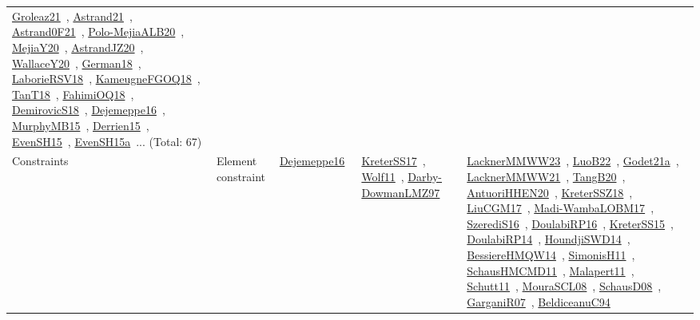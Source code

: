 {\begin{longtable}{lp{3cm}>{\raggedright\arraybackslash}p{6cm}>{\raggedright\arraybackslash}p{6cm}>{\raggedright\arraybackslash}p{8cm}}
\href{../works/Groleaz21.pdf}{Groleaz21}~\cite{Groleaz21}, \href{../works/Astrand21.pdf}{Astrand21}~\cite{Astrand21}, \href{../works/Astrand0F21.pdf}{Astrand0F21}~\cite{Astrand0F21}, \href{../works/Polo-MejiaALB20.pdf}{Polo-MejiaALB20}~\cite{Polo-MejiaALB20}, \href{../works/MejiaY20.pdf}{MejiaY20}~\cite{MejiaY20}, \href{../works/AstrandJZ20.pdf}{AstrandJZ20}~\cite{AstrandJZ20}, \href{../works/WallaceY20.pdf}{WallaceY20}~\cite{WallaceY20}, \href{../works/German18.pdf}{German18}~\cite{German18}, \href{../works/LaborieRSV18.pdf}{LaborieRSV18}~\cite{LaborieRSV18}, \href{../works/KameugneFGOQ18.pdf}{KameugneFGOQ18}~\cite{KameugneFGOQ18}, \href{../works/TanT18.pdf}{TanT18}~\cite{TanT18}, \href{../works/FahimiOQ18.pdf}{FahimiOQ18}~\cite{FahimiOQ18}, \href{../works/DemirovicS18.pdf}{DemirovicS18}~\cite{DemirovicS18}, \href{../works/Dejemeppe16.pdf}{Dejemeppe16}~\cite{Dejemeppe16}, \href{../works/MurphyMB15.pdf}{MurphyMB15}~\cite{MurphyMB15}, \href{../works/Derrien15.pdf}{Derrien15}~\cite{Derrien15}, \href{../works/EvenSH15.pdf}{EvenSH15}~\cite{EvenSH15}, \href{../works/EvenSH15a.pdf}{EvenSH15a}~\cite{EvenSH15a}... (Total: 67)\\
Constraints & Element constraint & \href{../works/Dejemeppe16.pdf}{Dejemeppe16}~\cite{Dejemeppe16} & \href{../works/KreterSS17.pdf}{KreterSS17}~\cite{KreterSS17}, \href{../works/Wolf11.pdf}{Wolf11}~\cite{Wolf11}, \href{../works/Darby-DowmanLMZ97.pdf}{Darby-DowmanLMZ97}~\cite{Darby-DowmanLMZ97} & \href{../works/LacknerMMWW23.pdf}{LacknerMMWW23}~\cite{LacknerMMWW23}, \href{../works/LuoB22.pdf}{LuoB22}~\cite{LuoB22}, \href{../works/Godet21a.pdf}{Godet21a}~\cite{Godet21a}, \href{../works/LacknerMMWW21.pdf}{LacknerMMWW21}~\cite{LacknerMMWW21}, \href{../works/TangB20.pdf}{TangB20}~\cite{TangB20}, \href{../works/AntuoriHHEN20.pdf}{AntuoriHHEN20}~\cite{AntuoriHHEN20}, \href{../works/KreterSSZ18.pdf}{KreterSSZ18}~\cite{KreterSSZ18}, \href{../works/LiuCGM17.pdf}{LiuCGM17}~\cite{LiuCGM17}, \href{../works/Madi-WambaLOBM17.pdf}{Madi-WambaLOBM17}~\cite{Madi-WambaLOBM17}, \href{../works/SzerediS16.pdf}{SzerediS16}~\cite{SzerediS16}, \href{../works/DoulabiRP16.pdf}{DoulabiRP16}~\cite{DoulabiRP16}, \href{../works/KreterSS15.pdf}{KreterSS15}~\cite{KreterSS15}, \href{../works/DoulabiRP14.pdf}{DoulabiRP14}~\cite{DoulabiRP14}, \href{../works/HoundjiSWD14.pdf}{HoundjiSWD14}~\cite{HoundjiSWD14}, \href{../works/BessiereHMQW14.pdf}{BessiereHMQW14}~\cite{BessiereHMQW14}, \href{../works/SimonisH11.pdf}{SimonisH11}~\cite{SimonisH11}, \href{../works/SchausHMCMD11.pdf}{SchausHMCMD11}~\cite{SchausHMCMD11}, \href{../works/Malapert11.pdf}{Malapert11}~\cite{Malapert11}, \href{../works/Schutt11.pdf}{Schutt11}~\cite{Schutt11}, \href{../works/MouraSCL08.pdf}{MouraSCL08}~\cite{MouraSCL08}, \href{../works/SchausD08.pdf}{SchausD08}~\cite{SchausD08}, \href{../works/GarganiR07.pdf}{GarganiR07}~\cite{GarganiR07}, \href{../works/BeldiceanuC94.pdf}{BeldiceanuC94}~\cite{BeldiceanuC94}\\

\end{longtable}}
